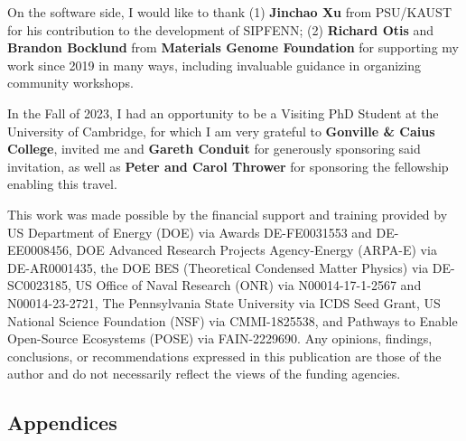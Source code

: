 \documentclass[letterpaper, 12pt]{report}
\newcommand{\mypart}[1]{\thispagestyle{empty}\part*{#1}\addtocounter{page}{-1}}
\begin{document}
On the software side, I would like to thank (1) \textbf{Jinchao Xu} from PSU/KAUST for his contribution to the development of SIPFENN; (2) \textbf{Richard Otis} and \textbf{Brandon Bocklund} from \textbf{Materials Genome Foundation} for supporting my work since 2019 in many ways, including invaluable guidance in organizing community workshops.

In the Fall of 2023, I had an opportunity to be a Visiting PhD Student at the University of Cambridge, for which I am very grateful to \textbf{Gonville \& Caius College}, invited me and \textbf{Gareth Conduit} for generously sponsoring said invitation, as well as \textbf{Peter and Carol Thrower} for sponsoring the fellowship enabling this travel.

This work was made possible by the financial support and training provided by US Department of Energy (DOE) via Awards DE-FE0031553 and DE-EE0008456, DOE Advanced Research Projects Agency-Energy (ARPA-E) via DE-AR0001435, the DOE BES (Theoretical Condensed Matter Physics) via DE-SC0023185, US Office of Naval Research (ONR) via N00014-17-1-2567 and N00014-23-2721, The Pennsylvania State University via ICDS Seed Grant, US National Science Foundation (NSF) via CMMI-1825538, and Pathways to Enable Open-Source Ecosystems (POSE) via FAIN-2229690. Any opinions, findings, conclusions, or recommendations expressed in this publication are those of the author and do not necessarily reflect the views of the funding agencies.


\newpage
\setlength\parindent{6pt} %


























\begin{appendices}

\mypart{Appendices}















\end{appendices}
\end{document}
